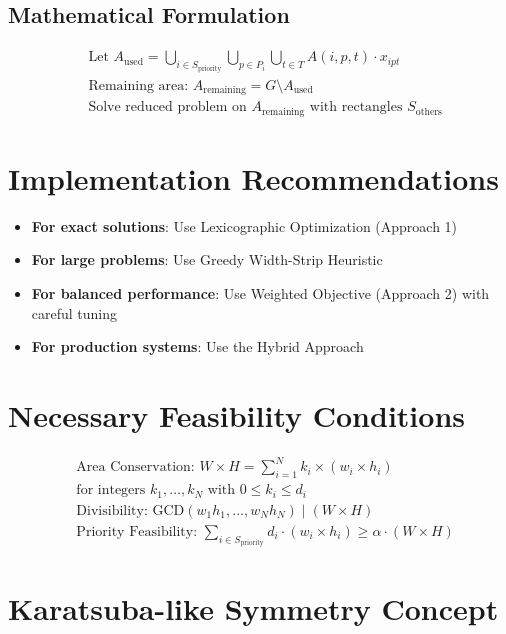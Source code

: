 \documentclass{article}
\begin{document}
\subsection{Mathematical Formulation}
\begin{align*}
&\text{Let } A_{\text{used}} = \bigcup_{i \in S_{\text{priority}}} \bigcup_{p \in P_i} \bigcup_{t \in T} A(i,p,t) \cdot x_{ipt} \\
&\text{Remaining area: } A_{\text{remaining}} = G \setminus A_{\text{used}} \\
&\text{Solve reduced problem on } A_{\text{remaining}} \text{ with rectangles } S_{\text{others}}
\end{align*}

\section{Implementation Recommendations}

\begin{itemize}
\item \textbf{For exact solutions}: Use Lexicographic Optimization (Approach 1)
\item \textbf{For large problems}: Use Greedy Width-Strip Heuristic
\item \textbf{For balanced performance}: Use Weighted Objective (Approach 2) with careful tuning
\item \textbf{For production systems}: Use the Hybrid Approach
\end{itemize}

\section{Necessary Feasibility Conditions}

\begin{align}
&\text{Area Conservation: } W \times H = \sum_{i=1}^{N} k_i \times (w_i \times h_i) \\
&\text{for integers } k_1, \ldots, k_N \text{ with } 0 \leq k_i \leq d_i \\
&\text{Divisibility: } \text{GCD}(w_1h_1, \ldots, w_Nh_N) \mid (W \times H) \\
&\text{Priority Feasibility: } \sum_{i \in S_{\text{priority}}} d_i \cdot (w_i \times h_i) \geq \alpha \cdot (W \times H)
\end{align}


\section{Karatsuba-like Symmetry Concept}
\end{document}
